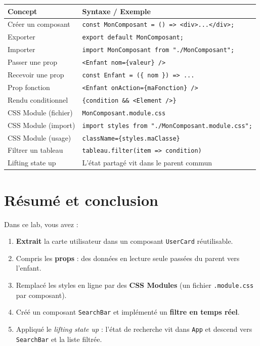 \documentclass[11pt,a4paper]{article}
\begin{document}
\begin{center}
\begin{tabular}{lp{8cm}}
\toprule
\textbf{Concept} & \textbf{Syntaxe / Exemple} \\
\midrule
Créer un composant & \texttt{const MonComposant = () => <div>...</div>;} \\
Exporter & \texttt{export default MonComposant;} \\
Importer & \texttt{import MonComposant from "./MonComposant";} \\
\midrule
Passer une prop & \texttt{<Enfant nom=\{valeur\} />} \\
Recevoir une prop & \texttt{const Enfant = (\{ nom \}) => ...} \\
Prop fonction & \texttt{<Enfant onAction=\{maFonction\} />} \\
Rendu conditionnel & \texttt{\{condition \&\& <Element />\}} \\
\midrule
CSS Module (fichier) & \texttt{MonComposant.module.css} \\
CSS Module (import) & \texttt{import styles from "./MonComposant.module.css";} \\
CSS Module (usage) & \texttt{className=\{styles.maClasse\}} \\
\midrule
Filtrer un tableau & \texttt{tableau.filter(item => condition)} \\
Lifting state up & L'état partagé vit dans le parent commun \\
\bottomrule
\end{tabular}
\end{center}

\newpage

\section{Résumé et conclusion}

Dans ce lab, vous avez :

\begin{enumerate}[nosep]
    \item \textbf{Extrait} la carte utilisateur dans un composant \texttt{UserCard} réutilisable.
    \item Compris les \textbf{props} : des données en lecture seule passées du parent vers l'enfant.
    \item Remplacé les styles en ligne par des \textbf{CSS Modules} (un fichier \texttt{.module.css} par composant).
    \item Créé un composant \texttt{SearchBar} et implémenté un \textbf{filtre en temps réel}.
    \item Appliqué le \emph{lifting state up} : l'état de recherche vit dans \texttt{App} et descend vers \texttt{SearchBar} et la liste filtrée.
\end{enumerate}
\end{document}
